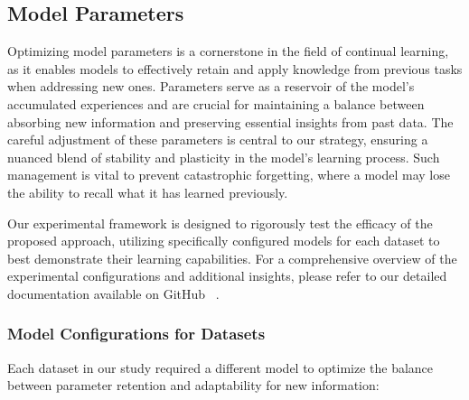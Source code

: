 \documentclass{article}
\begin{document}
\subsection{Model Parameters}

Optimizing model parameters is a cornerstone in the field of continual learning, as it enables models to effectively retain and apply knowledge from previous tasks when addressing new ones. Parameters serve as a reservoir of the model's accumulated experiences and are crucial for maintaining a balance between absorbing new information and preserving essential insights from past data. The careful adjustment of these parameters is central to our strategy, ensuring a nuanced blend of stability and plasticity in the model's learning process. Such management is vital to prevent catastrophic forgetting, where a model may lose the ability to recall what it has learned previously.

Our experimental framework is designed to rigorously test the efficacy of the proposed approach, utilizing specifically configured models for each dataset to best demonstrate their learning capabilities. For a comprehensive overview of the experimental configurations and additional insights, please refer to our detailed documentation available on GitHub ~\cite{github_page}.

\subsubsection{Model Configurations for Datasets}
Each dataset in our study required a different model to optimize the balance between parameter retention and adaptability for new information:
\end{document}
